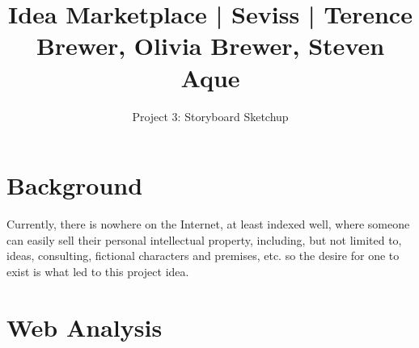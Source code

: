 \documentclass[]{article}
\title{Idea Marketplace | Seviss | Terence Brewer, Olivia Brewer, Steven Aque}
\author{Project 3: Storyboard Sketchup}
\begin{document}
\maketitle

\section{Background}
	Currently, there is nowhere on the Internet, at least indexed well, where someone can easily sell their personal intellectual property, including, but not limited to, ideas, consulting, fictional characters and premises, etc. so the desire for one to exist is what led to this project idea.
\section{Web Analysis}
\end{document}
